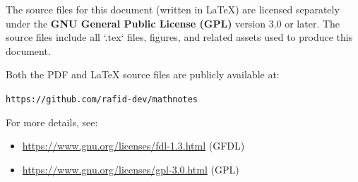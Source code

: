 The source files for this document (written in LaTeX) are licensed separately under the \textbf{GNU General Public License (GPL)} version 3.0 or later. The source files include all `.tex` files, figures, and related assets used to produce this document.

Both the PDF and LaTeX source files are publicly available at:
\begin{center}
\texttt{https://github.com/rafid-dev/mathnotes}
\end{center}

For more details, see:
\begin{itemize}
    \item \href{https://www.gnu.org/licenses/fdl-1.3.html}{https://www.gnu.org/licenses/fdl-1.3.html} (GFDL)
    \item \href{https://www.gnu.org/licenses/gpl-3.0.html}{https://www.gnu.org/licenses/gpl-3.0.html} (GPL)
\end{itemize}
